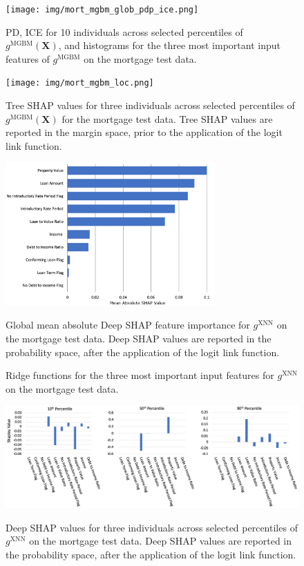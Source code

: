 \documentclass[information,article,submit,moreauthors,pdftex]{definitions/mdpi}
\begin{document}
\begin{figure}[H]
\centering
\texttt{[image: img/mort\_mgbm\_glob\_pdp\_ice.png]}
\label{fig:mort_mgbm_glob_pdp_ice}
\caption{PD, ICE for 10 individuals across selected percentiles of $g^\text{MGBM}(\mathbf{X})$, and histograms for the three most important input features of $g^\text{MGBM}$ on the mortgage test data.}
\end{figure}   


\begin{figure}[H]
\centering
\texttt{[image: img/mort\_mgbm\_loc.png]}
\label{fig:mort_mgbm_loc}
\caption{Tree SHAP values for three individuals across selected percentiles of $g^\text{MGBM}(\mathbf{X})$ for the mortgage test data. Tree SHAP values are reported in the margin space, prior to the application of the logit link function.}
\end{figure}   

\begin{figure}[H]
\centering
\includegraphics[width=8cm]{img/mort_xnn_glob.png}
\label{fig:mort_xnn_glob}
\caption{Global mean absolute Deep SHAP feature importance for $g^\text{XNN}$ on the mortgage test data. Deep SHAP values are reported in the probability space, after the application of the logit link function.}
\end{figure} 

\begin{figure}[H]
\centering
\label{fig:mort_xnn_glob_pdp_ice}
\caption{Ridge functions for the three most important input features for $g^\text{XNN}$ on the mortgage test data. }
\end{figure}   

\begin{figure}[H]
\centering
\includegraphics[width=15cm]{img/mort_xnn_loc.png}
\label{fig:mort_xnn_loc}
\caption{Deep SHAP values for three individuals across selected percentiles of $g^\text{XNN}$ on the mortgage test data. Deep SHAP values are reported in the probability space, after the application of the logit link function.}
\end{figure}
\end{document}
